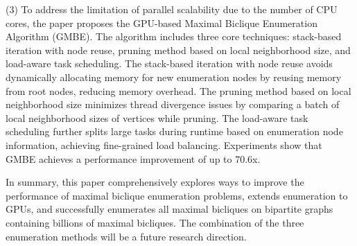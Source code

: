 (3) To address the limitation of parallel scalability due to the number of CPU cores, the paper proposes the GPU-based Maximal Biclique Enumeration Algorithm (GMBE). The algorithm includes three core techniques: stack-based iteration with node reuse, pruning method based on local neighborhood size, and load-aware task scheduling. The stack-based iteration with node reuse avoids dynamically allocating memory for new enumeration nodes by reusing memory from root nodes, reducing memory overhead. The pruning method based on local neighborhood size minimizes thread divergence issues by comparing a batch of local neighborhood sizes of vertices while pruning. The load-aware task scheduling further splits large tasks during runtime based on enumeration node information, achieving fine-grained load balancing. Experiments show that GMBE achieves a performance improvement of up to 70.6x.

In summary, this paper comprehensively explores ways to improve the performance of maximal biclique enumeration problems, extends enumeration to GPUs, and successfully enumerates all maximal bicliques on bipartite graphs containing billions of maximal bicliques. The combination of the three enumeration methods will be a future research direction.










